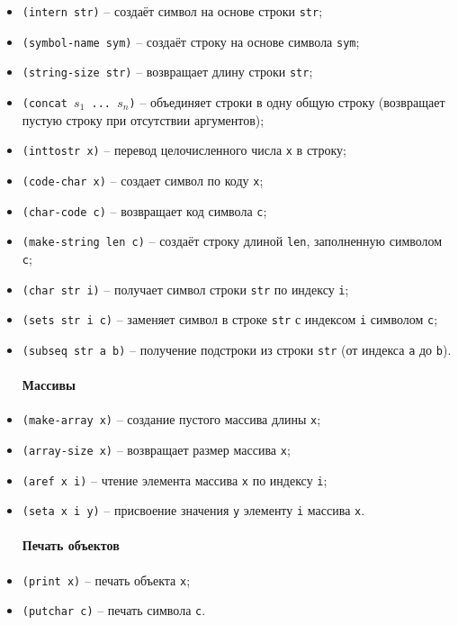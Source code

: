 \begin{itemize}
\item \texttt{(intern str)} -- создаёт символ на основе строки \texttt{str};
\item \texttt{(symbol-name sym)} -- создаёт строку на основе символа \texttt{sym};
\item \texttt{(string-size str)} -- возвращает длину строки \texttt{str};
\item \texttt{(concat $s_1$ ... $s_n$)} -- объединяет строки в одну общую строку (возвращает пустую строку при отсутствии аргументов);
\item \texttt{(inttostr x)} -- перевод целочисленного числа \texttt{x} в строку;
\item \texttt{(code-char x)} -- создает символ по коду \texttt{x};
\item \texttt{(char-code c)} -- возвращает код символа \texttt{c};
\item \texttt{(make-string len c)} -- создаёт строку длиной \texttt{len}, заполненную символом \texttt{c};
\item \texttt{(char str i)} -- получает символ строки \texttt{str} по индексу \texttt{i};
\item \texttt{(sets str i c)} -- заменяет символ в строке \texttt{str} с индексом \texttt{i} символом \texttt{c};
\item \texttt{(subseq str a b)} -- получение подстроки из строки \texttt{str} (от индекса \texttt{a} до \texttt{b}).

\paragraph{Массивы}

\item \texttt{(make-array x)} -- создание пустого массива длины \texttt{x};
\item \texttt{(array-size x)} -- возвращает размер массива \texttt{x};
\item \texttt{(aref x i)} -- чтение элемента массива \texttt{x} по индексу \texttt{i};
\item \texttt{(seta x i y)} -- присвоение значения \texttt{y} элементу \texttt{i} массива \texttt{x}.

\paragraph{Печать объектов}

\item \texttt{(print x)} -- печать объекта \texttt{x};
\item \texttt{(putchar c)} -- печать символа \texttt{c}.


\end{itemize}
